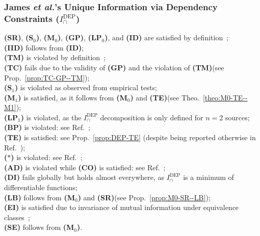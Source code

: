 \documentclass{article}
\makeatletter
\newcommand{\etalx}{\textit{et al.\@}\xspace}
\newcommand{\ts}[1]{\ensuremath{_{\text{#1}}}}
\newcommand{\SR}{\textbf{(SR)}\xspace} %
\newcommand{\Sz}{\textbf{(S\ts{0})}\xspace} %
\newcommand{\Mz}{\textbf{(M\ts{0})}\xspace} %
\newcommand{\GP}{\textbf{(GP)}\xspace} %
\newcommand{\LPz}{\textbf{(LP\ts{0})}\xspace} %
\newcommand{\ID}{\textbf{(ID)}\xspace} %
\newcommand{\IID}{\textbf{(IID)}\xspace} %
\newcommand{\TM}{\textbf{(TM)}\xspace} %
\newcommand{\TC}{\textbf{(TC)}\xspace} %
\newcommand{\So}{\textbf{(S\ts{1})}\xspace} %
\newcommand{\Mo}{\textbf{(M\ts{1})}\xspace} %
\newcommand{\LPo}{\textbf{(LP\ts{1})}\xspace} %
\newcommand{\BP}{\textbf{(BP)}\xspace} %
\newcommand{\TE}{\textbf{(TE)}\xspace} %
\newcommand{\AST}{\textbf{($\boldsymbol{\ast}$)}\xspace} %
\newcommand{\AD}{\textbf{(AD)}\xspace} %
\newcommand{\CO}{\textbf{(CO)}\xspace} %
\newcommand{\LB}{\textbf{(LB)}\xspace} %
\newcommand{\EI}{\textbf{(EI)}\xspace} %
\newcommand{\SE}{\textbf{(SE)}\xspace} %
\newcommand{\DI}{\textbf{(DI)}\xspace}
\newcommand{\IDEP}{\ensuremath{I_\cap^{\text{DEP}}}\xspace}
\makeatother
\begin{document}
\subsubsection*{James \etalx's Unique Information via Dependency Constraints ($\IDEP$)}
    \SR, \Sz, \Mz, \GP, \LPz, and \ID are satisfied by definition~\cite{james2018unique}; \\
    \IID follows from \ID; \\
    \TM is violated by definition~\cite{james2018unique}; \\
    \TC fails due to the validity of \GP and the violation of \TM (see Prop.~\ref{prop:TC-GP--TM}); \\
    \So is violated as observed from empirical tests; \\
    \Mo is satisfied, as it follows from \Mz and \TE (see Theo.~\ref{theo:M0-TE--M1}); \\
    \LPo is violated, as the $\IDEP$ decomposition is only defined for $n=2$ sources; \\
    \BP is violated: see Ref.~\cite{kolchinsky2022novel}; \\
    \TE is satisfied: see Prop.~\ref{prop:DEP-TE} (despite being reported otherwise in Ref.~\cite{kolchinsky2022novel}); \\
    \AST is violated: see Ref.~\cite{kolchinsky2022novel}; \\
    \AD is violated while \CO is satisfied: see Ref.~\cite{rauh2014reconsidering}; \\
    \DI fails globally but holds almost everywhere, as \IDEP is a minimum of differentiable functions; \\  
    \LB follows from \Mz and \SR (see Prop.~\ref{prop:M0-SR--LB}); \\
    \EI is satisfied due to invariance of mutual information under equivalence classes~\cite{li2011connection}; \\
    \SE follows from \Mz.
\end{document}
